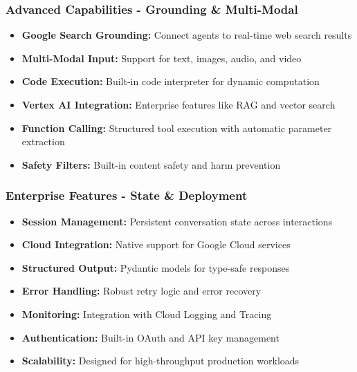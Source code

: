 \begin{frame}[fragile]\frametitle{Advanced Capabilities - Grounding \& Multi-Modal}
      \begin{itemize}
	\item \textbf{Google Search Grounding:} Connect agents to real-time web search results
	\item \textbf{Multi-Modal Input:} Support for text, images, audio, and video
	\item \textbf{Code Execution:} Built-in code interpreter for dynamic computation
	\item \textbf{Vertex AI Integration:} Enterprise features like RAG and vector search
	\item \textbf{Function Calling:} Structured tool execution with automatic parameter extraction
	\item \textbf{Safety Filters:} Built-in content safety and harm prevention
	  \end{itemize}
\end{frame}

\begin{frame}[fragile]\frametitle{Enterprise Features - State \& Deployment}
      \begin{itemize}
	\item \textbf{Session Management:} Persistent conversation state across interactions
	\item \textbf{Cloud Integration:} Native support for Google Cloud services
	\item \textbf{Structured Output:} Pydantic models for type-safe responses
	\item \textbf{Error Handling:} Robust retry logic and error recovery
	\item \textbf{Monitoring:} Integration with Cloud Logging and Tracing
	\item \textbf{Authentication:} Built-in OAuth and API key management
	\item \textbf{Scalability:} Designed for high-throughput production workloads
	  \end{itemize}
\end{frame}


